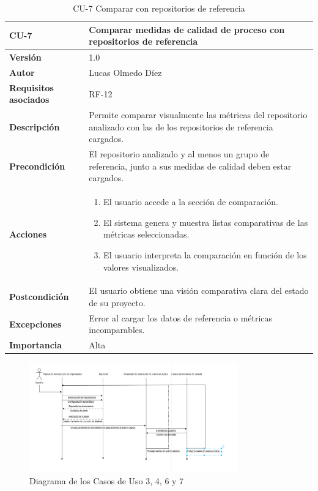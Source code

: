 \clearpage
\begin{table}[p]
    \centering
    \begin{tabularx}{\linewidth}{ p{} p{} }
        \toprule
        \textbf{CU-7} & Comparar medidas de calidad de proceso con repositorios de referencia \\
        \midrule
        \textbf{Versión} & 1.0 \\
        \textbf{Autor} & Lucas Olmedo Díez \\
        \textbf{Requisitos asociados} & RF-12 \\
        \textbf{Descripción} & Permite comparar visualmente las métricas del repositorio analizado con las de los repositorios de referencia cargados. \\
        \textbf{Precondición} & El repositorio analizado y al menos un grupo de referencia, junto a sus medidas de calidad deben estar cargados. \\
        \textbf{Acciones} &
        \begin{enumerate}
            \def\labelenumi{\arabic{enumi}.}
            \tightlist
            \item El usuario accede a la sección de comparación.
            \item El sistema genera y muestra listas comparativas de las métricas seleccionadas.
            \item El usuario interpreta la comparación en función de los valores visualizados.
        \end{enumerate}\\
        \textbf{Postcondición} & El usuario obtiene una visión comparativa clara del estado de su proyecto. \\
        \textbf{Excepciones} & Error al cargar los datos de referencia o métricas incomparables. \\
        \textbf{Importancia} & Alta \\
        \bottomrule
    \end{tabularx}
    \caption{CU-7 Comparar con repositorios de referencia}
\end{table}

\begin{figure}[H]
\centering
\includegraphics[width=0.8\textwidth]{img/DiagramaCU3-CU4-CU6-CU7.png}
\caption{Diagrama de los Casos de Uso 3, 4, 6 y 7}
\label{fig:DiagramaCU3-CU4-CU6-CU7}
\end{figure}

